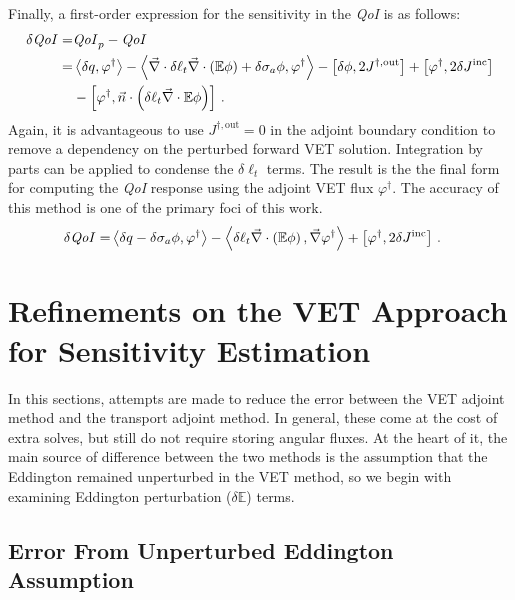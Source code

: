 \documentclass[12pt]{report}
\newcommand{\bra}{\left\langle}
\newcommand{\ket}{\right\rangle}
\newcommand{\sbra}{\left[}
\newcommand{\sket}{\right]}
\renewcommand{\div}{\vec{\nabla} \cdot}
\newcommand{\grad}{\vec{\nabla}}
\newcommand{\vefadj}{\varphi^\dag}
\newcommand{\vn}{\vec{n}}
\newcommand{\Edd}{\mathbb{E}}
\newcommand{\siga}{\sigma_a}
\newcommand{\isigt}{\ell_t}
\newcommand{\scalSource}{q}
\newcommand{\qoi}{{\it QoI}\xspace}
\begin{document}
Finally, a first-order expression for the sensitivity in the \qoi is as follows:
\begin{equation}
\label{QoIVETAdjlong}
\begin{split}
\delta \qoi =& \qoi_p - \qoi \\ 
=& \bra \delta \scalSource , \vefadj \ket - \bra \div \delta \isigt \div \left( \Edd \phi \right)  + \delta \siga \phi, \vefadj \ket 
- \sbra \delta \phi, 2J^{\dag,\text{out}} \sket + \sbra \vefadj, 2 \delta J^{\text{inc}} \sket \\
& - \sbra \vefadj, \vn \cdot \left( \delta \isigt \div \Edd \phi \right) \sket \,.
\end{split}
\end{equation}
Again, it is advantageous to use $J^{\dag,\text{out}}=0$ in the adjoint boundary condition to remove a dependency on the 
perturbed forward VET solution. Integration by parts can be applied to condense the $\delta \isigt$ terms. The result is the the final form for computing the \qoi response using the adjoint VET flux $\vefadj$. The accuracy of this method is one of the primary foci of this work.
\begin{equation}
\label{VETsens}
\begin{split}
\delta \qoi =&  \bra \delta \scalSource - \delta \siga \phi, \vefadj \ket  - \bra \delta \isigt \div \left( \Edd \phi \right) , \grad \vefadj \ket
 + \sbra \vefadj, 2 \delta J^{\text{inc}} \sket \,.
\end{split}
\end{equation}



\section{Refinements on the VET Approach for Sensitivity Estimation}

In this sections, attempts are made to reduce the error between the VET adjoint method and the transport adjoint method. In general, these come at the cost of extra solves, but still do not require storing angular fluxes. At the heart of it, the main source of difference between the two methods is the assumption that the Eddington remained unperturbed in the VET method, so we begin with examining Eddington perturbation ($\delta \Edd$) terms. 
\subsection{Error From Unperturbed Eddington Assumption}
\end{document}

